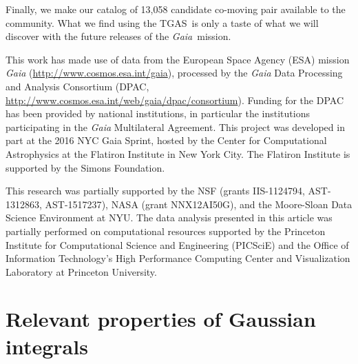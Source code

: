 \documentclass[manuscript, letterpaper]{aastex6}
\newcommand{\project}[1]{\textsl{#1}}
\newcommand{\acronym}[1]{{\small{#1}}}
\newcommand{\gaia}{\project{Gaia}}
\newcommand{\apogee}{\project{\acronym{APOGEE}}}
\newcommand{\tgas}{\acronym{TGAS}}
\begin{document}
Finally, we make our catalog of 13,058 candidate co-moving pair available to the
community.
What we find using the \tgas\ is only a taste of what we will discover with
the future releases of the \gaia\ mission.

\acknowledgements

This work has made use of data from the European Space Agency (ESA) mission
{\it Gaia} (\url{http://www.cosmos.esa.int/gaia}), processed by the {\it Gaia}
Data Processing and Analysis Consortium (DPAC,
\url{http://www.cosmos.esa.int/web/gaia/dpac/consortium}). Funding for the DPAC
has been provided by national institutions, in particular the institutions
participating in the {\it Gaia} Multilateral Agreement. This project was
developed in part at the 2016 NYC Gaia Sprint, hosted by the Center for
Computational Astrophysics at the Flatiron Institute in New York City. The
Flatiron Institute is supported by the Simons Foundation.

This research was partially supported by the \acronym{NSF} (grants
  \acronym{IIS-1124794}, \acronym{AST-1312863}, \acronym{AST-1517237}),
  \acronym{NASA} (grant \acronym{NNX12AI50G}),
  and the Moore-Sloan Data Science Environment at \acronym{NYU}. The data
analysis presented in this article was partially performed on computational
resources supported by the Princeton Institute for Computational Science and
Engineering (PICSciE) and the Office of Information Technology's High
Performance Computing Center and Visualization Laboratory at Princeton
University.






\appendix

\section{Relevant properties of Gaussian integrals}
\label{sec:appendixA}
\end{document}
